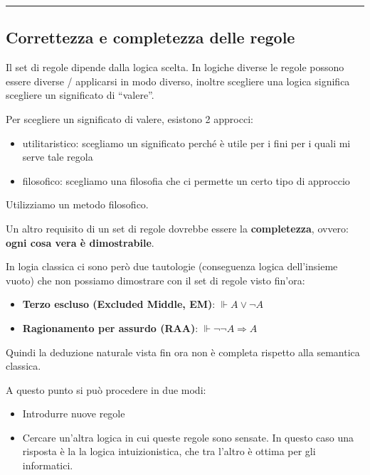 \documentclass[
  a4paper,
]{article}
\providecommand{\tightlist}{%
  \setlength{\itemsep}{0pt}\setlength{\parskip}{0pt}}
\begin{document}
\par\noindent\rule{\linewidth}{0.4pt}\par\vspace{6pt}

\hypertarget{correttezza-e-completezza-delle-regole}{%
\subsection{Correttezza e completezza delle
regole}\label{correttezza-e-completezza-delle-regole}}

Il set di regole dipende dalla logica scelta. In logiche diverse le
regole possono essere diverse / applicarsi in modo diverso, inoltre
scegliere una logica significa scegliere un significato di ``valere''.

Per scegliere un significato di valere, esistono 2 approcci:

\begin{itemize}
\tightlist
\item
  utilitaristico: scegliamo un significato perché è utile per i fini per
  i quali mi serve tale regola
\item
  filosofico: scegliamo una filosofia che ci permette un certo tipo di
  approccio
\end{itemize}

Utilizziamo un metodo filosofico.

Un altro requisito di un set di regole dovrebbe essere la
\textbf{completezza}, ovvero: \textbf{ogni cosa vera è dimostrabile}.

In logia classica ci sono però due tautologie (conseguenza logica
dell'insieme vuoto) che non possiamo dimostrare con il set di regole
visto fin'ora:

\begin{itemize}
\tightlist
\item
  \textbf{Terzo escluso (Excluded Middle, EM)}: \(\Vdash A \lor \neg A\)
\item
  \textbf{Ragionamento per assurdo (RAA)}:
  \(\Vdash \neg \neg A \Rightarrow A\)
\end{itemize}

Quindi la deduzione naturale vista fin ora non è completa rispetto alla
semantica classica.

A questo punto si può procedere in due modi:

\begin{itemize}
\tightlist
\item
  Introdurre nuove regole
\item
  Cercare un'altra logica in cui queste regole sono sensate. In questo
  caso una risposta è la la logica intuizionistica, che tra l'altro è
  ottima per gli informatici.
\end{itemize}
\end{document}
